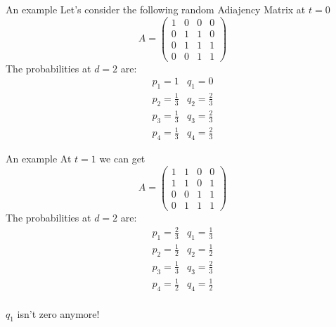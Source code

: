 \documentclass{beamer}
\begin{document}
\begin{frame}{An example}
 Let's consider the following random Adiajency Matrix at $t=0$
\begin{displaymath}
A = \left( \begin{array}{cccc} 1 & 0 & 0 & 0 \\ 0 & 1 & 1 & 0 \\ 0 & 1 & 1 & 1 \\ 0 & 0 & 1 & 1 \end{array} \right)
\end{displaymath}
The probabilities at $d=2$ are:
\begin{displaymath}
 \begin{array}{cc} p_1=1 & q_1=0 \\ p_2=\frac{1}{3} & q_2=\frac{2}{3} \\ p_3=\frac{1}{3} & q_3=\frac{2}{3} \\ p_4=\frac{1}{3} & q_4=\frac{2}{3} \end{array}
\end{displaymath}
\end{frame}

\begin{frame}{An example}
 At $t=1$ we can get
\begin{displaymath}
A = \left( \begin{array}{cccc} 1 & 1 & 0 & 0 \\ 1 & 1 & 0 & 1 \\ 0 & 0 & 1 & 1 \\ 0 & 1 & 1 & 1 \end{array} \right)
\end{displaymath}
The probabilities at $d=2$ are:
\begin{displaymath}
 \begin{array}{cc} p_1=\frac{2}{3} & q_1=\frac{1}{3} \\ p_2=\frac{1}{2} & q_2=\frac{1}{2} \\ p_3=\frac{1}{3} & q_3=\frac{2}{3} \\ p_4=\frac{1}{2} & q_4=\frac{1}{2} \end{array}
\end{displaymath}
\\$q_1$ isn't zero anymore!
\end{frame}
\end{document}
